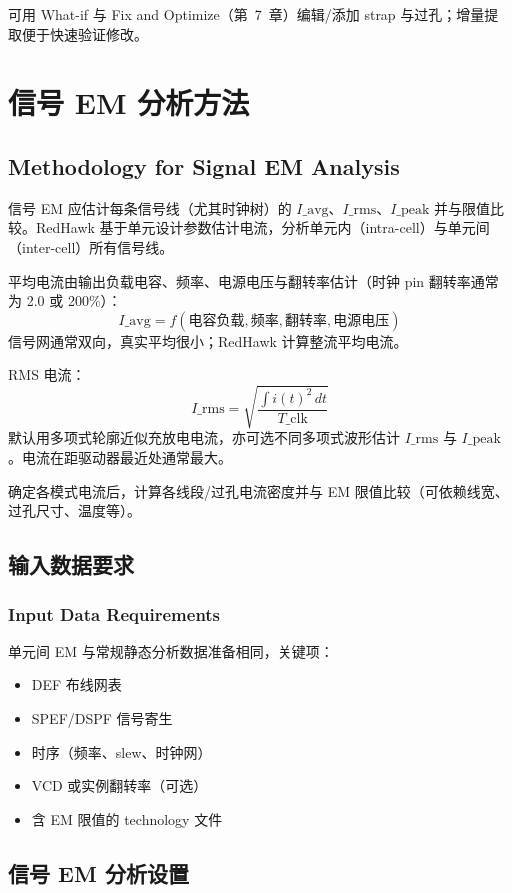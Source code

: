 可用 What-if 与 Fix and Optimize（第~7~章）编辑/添加 strap 与过孔；增量提取便于快速验证修改。


\section{信号 EM 分析方法}
\subsection*{Methodology for Signal EM Analysis}

信号 EM 应估计每条信号线（尤其时钟树）的 $I\_{\mathrm{avg}}$、$I\_{\mathrm{rms}}$、$I\_{\mathrm{peak}}$ 并与限值比较。RedHawk 基于单元设计参数估计电流，分析单元内（intra-cell）与单元间（inter-cell）所有信号线。

平均电流由输出负载电容、频率、电源电压与翻转率估计（时钟 pin 翻转率通常为 2.0 或 200\%）：
\[
I\_{\mathrm{avg}} = f(\text{电容负载}, \text{频率}, \text{翻转率}, \text{电源电压})
\]
信号网通常双向，真实平均很小；RedHawk 计算整流平均电流。

RMS 电流：
\[
I\_{\mathrm{rms}} = \sqrt{\frac{\int i(t)^2\,dt}{T\_{\mathrm{clk}}}}
\]
默认用多项式轮廓近似充放电电流，亦可选不同多项式波形估计 $I\_{\mathrm{rms}}$ 与 $I\_{\mathrm{peak}}$。电流在距驱动器最近处通常最大。

确定各模式电流后，计算各线段/过孔电流密度并与 EM 限值比较（可依赖线宽、过孔尺寸、温度等）。

\subsection{输入数据要求}
\subsubsection*{Input Data Requirements}

单元间 EM 与常规静态分析数据准备相同，关键项：
\begin{itemize}
  \item DEF 布线网表
  \item SPEF/DSPF 信号寄生
  \item 时序（频率、slew、时钟网）
  \item VCD 或实例翻转率（可选）
  \item 含 EM 限值的 technology 文件
\end{itemize}

\subsection{信号 EM 分析设置}
